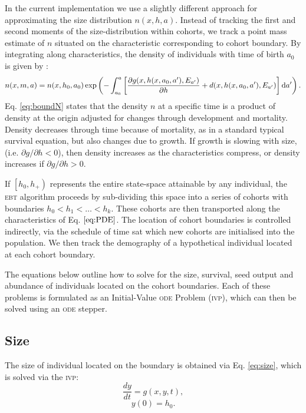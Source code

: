 \documentclass[10pt,twoside]{article}
\begin{document}
In the current implementation we use a slightly different approach for
approximating the size distribution \(n(x,h,a)\). Instead of tracking
the first and second moments of the size-distribution within cohorts, we
track a point mass estimate of \(n\) situated on the characteristic
corresponding to cohort boundary. By integrating along characteristics,
the density of individuals with time of birth \(a_{0}\) is given by
\citep{Deroos-1997}:
\begin{equation}\label{eq:boundN}
  n(x, m, a)  =n(x,h_0 ,a_0) 
   \exp \left(-\int _{a_0}^{a} \left[\frac{\partial g(x,h(x, a_0, a^\prime),E_{a^\prime})}{\partial h} +d(x,h(x, a_0, a^\prime),E_{a^\prime})\right] {\rm d}a^\prime \right).
\end{equation}
Eq. \ref{eq:boundN} states that the density \(n\) at a specific time is
a product of density at the origin adjusted for changes through
development and mortality. Density decreases through time because of
mortality, as in a standard typical survival equation, but also changes
due to growth. If growth is slowing with size, (i.e.
\(\partial g / \partial h < 0\)), then density increases as the
characteristics compress, or density increases if
\(\partial g / \partial h > 0\).

If \(\left[h_0, h_+ \right)\) represents the entire state-space
attainable by any individual, the \textsc{ebt} algorithm proceeds by sub-dividing
this space into a series of cohorts with boundaries
\(h_0 < h_1 < \ldots < h_k\). These cohorts are then transported along
the characteristics of Eq. \(\ref{eq:PDE}\). The location of cohort
boundaries is controlled indirectly, via the schedule of time sat which
new cohorts are initialised into the population. We then track the
demography of a hypothetical individual located at each cohort boundary.

The equations below outline how to solve for the size, survival, seed
output and abundance of individuals located on the cohort boundaries.
Each of these problems is formulated as an Initial-Value \textsc{ode} Problem
(\textsc{ivp}), which can then be solved using an \textsc{ode} stepper.

\subsection{Size}\label{size}

The size of individual located on the boundary is obtained via Eq.
\ref{eq:size}, which is solved via the \textsc{ivp}:
\[\frac{dy}{dt} = g(x,y,t),\] \[ y(0) = h_0.\]
\end{document}
